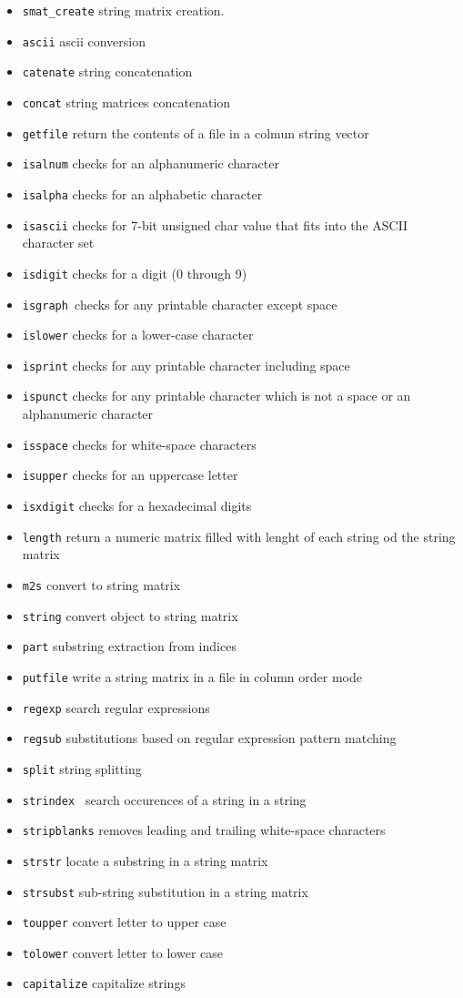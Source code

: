 \begin{itemize}
\item \verb+smat_create+ string matrix creation.
\item \verb+ascii+ ascii conversion 
\item \verb+catenate+ string concatenation 
\item \verb+concat+ string matrices concatenation 
\item \verb+getfile+ return the contents of a file in a colmun string vector 
\item \verb+isalnum+ checks for an alphanumeric character 
\item \verb+isalpha+ checks for an alphabetic character
\item \verb+isascii+ checks for 7-bit unsigned char value that fits into the ASCII character set 
\item \verb+isdigit+ checks for a digit (0 through 9) 
\item \verb+isgraph +checks for any printable character except space 
\item \verb+islower+ checks for a lower-case character 
\item \verb+isprint+  checks for any printable character including space 
\item \verb+ispunct+ checks for any printable character which is not a space or an alphanumeric character 
\item \verb+isspace+  checks for white-space characters 
\item \verb+isupper+  checks for an uppercase letter 
\item \verb+isxdigit+  checks for a hexadecimal digits 
\item \verb+length+  return a numeric matrix filled with lenght of each string od the string matrix
\item \verb+m2s+  convert to string matrix 
\item \verb+string+  convert object to string matrix 
\item \verb+part+ substring extraction from indices 
\item \verb+putfile+  write a string matrix in a file in column order mode 
\item \verb+regexp+  search regular expressions 
\item \verb+regsub+ substitutions based on regular expression pattern matching 
\item \verb+split+ string splitting 
\item \verb+strindex + search occurences of a string in a string 
\item \verb+stripblanks+ removes leading and trailing white-space characters 
\item \verb+strstr+  locate a substring in a string matrix 
\item \verb+strsubst+ sub-string substitution in a string matrix 
\item \verb+toupper+ convert letter to upper case 
\item \verb+tolower+  convert letter to lower case 
\item \verb+capitalize+ capitalize strings 
\end{itemize}

